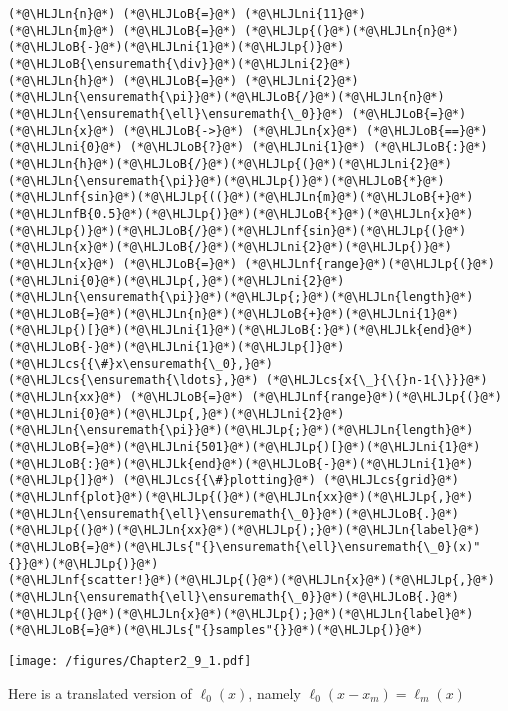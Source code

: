 \documentclass[12pt,a4paper]{article}
\newcommand{\HLJLk}[1]{\textcolor[RGB]{148,91,176}{\textbf{#1}}}
\newcommand{\HLJLn}[1]{#1}
\newcommand{\HLJLnf}[1]{\textcolor[RGB]{66,102,213}{#1}}
\newcommand{\HLJLs}[1]{\textcolor[RGB]{201,61,57}{#1}}
\newcommand{\HLJLnfB}[1]{\textcolor[RGB]{59,151,46}{#1}}
\newcommand{\HLJLni}[1]{\textcolor[RGB]{59,151,46}{#1}}
\newcommand{\HLJLoB}[1]{\textcolor[RGB]{102,102,102}{\textbf{#1}}}
\newcommand{\HLJLp}[1]{#1}
\newcommand{\HLJLcs}[1]{\textcolor[RGB]{153,153,119}{\textit{#1}}}
\begin{document}
\begin{lstlisting}
(*@\HLJLn{n}@*) (*@\HLJLoB{=}@*) (*@\HLJLni{11}@*)
(*@\HLJLn{m}@*) (*@\HLJLoB{=}@*) (*@\HLJLp{(}@*)(*@\HLJLn{n}@*)(*@\HLJLoB{-}@*)(*@\HLJLni{1}@*)(*@\HLJLp{)}@*)(*@\HLJLoB{\ensuremath{\div}}@*)(*@\HLJLni{2}@*)
(*@\HLJLn{h}@*) (*@\HLJLoB{=}@*) (*@\HLJLni{2}@*)(*@\HLJLn{\ensuremath{\pi}}@*)(*@\HLJLoB{/}@*)(*@\HLJLn{n}@*)
(*@\HLJLn{\ensuremath{\ell}\ensuremath{\_0}}@*) (*@\HLJLoB{=}@*) (*@\HLJLn{x}@*) (*@\HLJLoB{->}@*) (*@\HLJLn{x}@*) (*@\HLJLoB{==}@*) (*@\HLJLni{0}@*) (*@\HLJLoB{?}@*) (*@\HLJLni{1}@*) (*@\HLJLoB{:}@*) (*@\HLJLn{h}@*)(*@\HLJLoB{/}@*)(*@\HLJLp{(}@*)(*@\HLJLni{2}@*)(*@\HLJLn{\ensuremath{\pi}}@*)(*@\HLJLp{)}@*)(*@\HLJLoB{*}@*)(*@\HLJLnf{sin}@*)(*@\HLJLp{((}@*)(*@\HLJLn{m}@*)(*@\HLJLoB{+}@*)(*@\HLJLnfB{0.5}@*)(*@\HLJLp{)}@*)(*@\HLJLoB{*}@*)(*@\HLJLn{x}@*)(*@\HLJLp{)}@*)(*@\HLJLoB{/}@*)(*@\HLJLnf{sin}@*)(*@\HLJLp{(}@*)(*@\HLJLn{x}@*)(*@\HLJLoB{/}@*)(*@\HLJLni{2}@*)(*@\HLJLp{)}@*)
(*@\HLJLn{x}@*) (*@\HLJLoB{=}@*) (*@\HLJLnf{range}@*)(*@\HLJLp{(}@*)(*@\HLJLni{0}@*)(*@\HLJLp{,}@*)(*@\HLJLni{2}@*)(*@\HLJLn{\ensuremath{\pi}}@*)(*@\HLJLp{;}@*)(*@\HLJLn{length}@*)(*@\HLJLoB{=}@*)(*@\HLJLn{n}@*)(*@\HLJLoB{+}@*)(*@\HLJLni{1}@*)(*@\HLJLp{)[}@*)(*@\HLJLni{1}@*)(*@\HLJLoB{:}@*)(*@\HLJLk{end}@*)(*@\HLJLoB{-}@*)(*@\HLJLni{1}@*)(*@\HLJLp{]}@*) (*@\HLJLcs{{\#}x\ensuremath{\_0},}@*) (*@\HLJLcs{\ensuremath{\ldots},}@*) (*@\HLJLcs{x{\_}{\{}n-1{\}}}@*)
(*@\HLJLn{xx}@*) (*@\HLJLoB{=}@*) (*@\HLJLnf{range}@*)(*@\HLJLp{(}@*)(*@\HLJLni{0}@*)(*@\HLJLp{,}@*)(*@\HLJLni{2}@*)(*@\HLJLn{\ensuremath{\pi}}@*)(*@\HLJLp{;}@*)(*@\HLJLn{length}@*)(*@\HLJLoB{=}@*)(*@\HLJLni{501}@*)(*@\HLJLp{)[}@*)(*@\HLJLni{1}@*)(*@\HLJLoB{:}@*)(*@\HLJLk{end}@*)(*@\HLJLoB{-}@*)(*@\HLJLni{1}@*)(*@\HLJLp{]}@*) (*@\HLJLcs{{\#}plotting}@*) (*@\HLJLcs{grid}@*)
(*@\HLJLnf{plot}@*)(*@\HLJLp{(}@*)(*@\HLJLn{xx}@*)(*@\HLJLp{,}@*)(*@\HLJLn{\ensuremath{\ell}\ensuremath{\_0}}@*)(*@\HLJLoB{.}@*)(*@\HLJLp{(}@*)(*@\HLJLn{xx}@*)(*@\HLJLp{);}@*)(*@\HLJLn{label}@*)(*@\HLJLoB{=}@*)(*@\HLJLs{"{}\ensuremath{\ell}\ensuremath{\_0}(x)"{}}@*)(*@\HLJLp{)}@*)
(*@\HLJLnf{scatter!}@*)(*@\HLJLp{(}@*)(*@\HLJLn{x}@*)(*@\HLJLp{,}@*)(*@\HLJLn{\ensuremath{\ell}\ensuremath{\_0}}@*)(*@\HLJLoB{.}@*)(*@\HLJLp{(}@*)(*@\HLJLn{x}@*)(*@\HLJLp{);}@*)(*@\HLJLn{label}@*)(*@\HLJLoB{=}@*)(*@\HLJLs{"{}samples"{}}@*)(*@\HLJLp{)}@*)
\end{lstlisting}

\texttt{[image: /figures/Chapter2\_9\_1.pdf]}

Here is a translated version of $\ell_0(x)$, namely $\ell_0(x-x_{m}) = \ell_{m}(x)$
\end{document}
